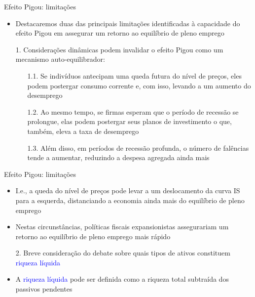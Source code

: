 \documentclass[10pt]{beamer}
\begin{document}
\begin{frame}{Efeito Pigou: limitações}
    \begin{itemize}
        \item Destacaremos duas das principais limitações identificadas à capacidade do efeito Pigou em assegurar um retorno ao equilíbrio de pleno emprego
        \bigskip
        \item[1.] Considerações dinâmicas podem invalidar o efeito Pigou como um mecanismo auto-equilibrador:
        \bigskip
        \begin{enumerate}
            \item[1.1.] Se indivíduos antecipam uma queda futura do nível de preços, eles podem postergar consumo corrente e, com isso, levando a um aumento do desemprego
            \bigskip
            \item[1.2.] Ao mesmo tempo, se firmas esperam que o período de recessão se prolongue, elas podem postergar seus planos de investimento o que, também, eleva a taxa de desemprego
            \bigskip
            \item[1.3.] Além disso, em períodos de recessão profunda, o número de falências tende a aumentar, reduzindo a despesa agregada ainda mais
        \end{enumerate}
    \end{itemize}
\end{frame}

\begin{frame}{Efeito Pigou: limitações}
    \begin{itemize}
        \item I.e., a queda do nível de preços pode levar a um deslocamento da curva IS para a esquerda, distanciando a economia ainda mais do equilíbrio de pleno emprego
        \bigskip
        \item Nestas circunstâncias, políticas fiscais expansionistas assegurariam um retorno ao equilíbrio de pleno emprego mais rápido
        \bigskip
        \item[2.] Breve consideração do debate sobre quais tipos de ativos constituem \textcolor{blue}{riqueza líquida}
        \bigskip
        \item A \textcolor{blue}{riqueza líquida} pode ser definida como a riqueza total subtraída dos passivos pendentes
    \end{itemize}
\end{frame}
\end{document}

